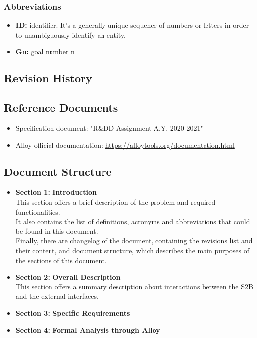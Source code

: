 \documentclass[12pt]{article}
\begin{document}
\subsubsection{Abbreviations}
\begin{itemize}
    \item {\textbf{ID:} identifier. It's a generally unique sequence of numbers or letters in order to unambiguously identify an entity.}
    \item {\textbf{Gn:} goal number n}
\end{itemize}
\subsection{Revision History}
\subsection{Reference Documents}
\begin{itemize}
    \item {Specification document: "R\&DD Assignment A.Y. 2020-2021"}
    \item {Alloy official documentation: \href{https://alloytools.org/documentation.html}{https://alloytools.org/documentation.html}}
\end{itemize}
\subsection{Document Structure}
\begin{itemize}
    \item {\textbf{Section 1: Introduction}\\This section offers a brief description of the problem and required functionalities. \\It also contains the list of definitions, acronyms and abbreviations that could be found in this document. \\Finally, there are changelog of the document, containing the revisions list and their content, and document structure, which describes the main purposes of the sections of this document.}
    \item {\textbf{Section 2: Overall Description}\\This section offers a summary description about interactions between the S2B and the external interfaces.}
    \item {\textbf{Section 3: Specific Requirements}}
    \item {\textbf{Section 4: Formal Analysis through Alloy}}
\end{itemize}
\newpage
\end{document}
